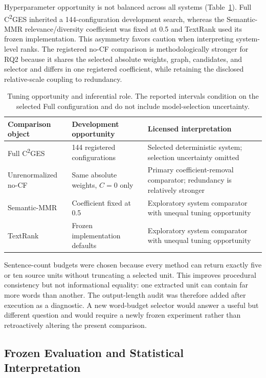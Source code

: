 \documentclass[applsci,article,submit,moreauthors]{Definitions/mdpi}
\newcommand{\cges}{C\textsuperscript{2}GES}
\begin{document}
Hyperparameter opportunity is not balanced across all systems (Table~\ref{tab:tuning-opportunity}). Full \cges{} inherited a 144-configuration development search, whereas the Semantic-MMR relevance/diversity coefficient was fixed at 0.5 and TextRank used its frozen implementation. This asymmetry favors caution when interpreting system-level ranks. The registered no-CF comparison is methodologically stronger for RQ2 because it shares the selected absolute weights, graph, candidates, and selector and differs in one registered coefficient, while retaining the disclosed relative-scale coupling to redundancy.

\begin{table}[H]
\caption{Tuning opportunity and inferential role. The reported intervals condition on the selected Full configuration and do not include model-selection uncertainty.}
\label{tab:tuning-opportunity}\centering\small
\begin{tabular}{p{}p{}p{}}
\toprule
Comparison object & Development opportunity & Licensed interpretation\\
\midrule
Full \cges{} & 144 registered configurations & Selected deterministic system; selection uncertainty omitted\\
Unrenormalized no-CF & Same absolute weights, $C=0$ only & Primary coefficient-removal comparator; redundancy is relatively stronger\\
Semantic-MMR & Coefficient fixed at 0.5 & Exploratory system comparator with unequal tuning opportunity\\
TextRank & Frozen implementation defaults & Exploratory system comparator with unequal tuning opportunity\\
\bottomrule
\end{tabular}
\end{table}

Sentence-count budgets were chosen because every method can return exactly five or ten source units without truncating a selected unit. This improves procedural consistency but not informational equality: one extracted unit can contain far more words than another. The output-length audit was therefore added after execution as a diagnostic. A new word-budget selector would answer a useful but different question and would require a newly frozen experiment rather than retroactively altering the present comparison.

\subsection{Frozen Evaluation and Statistical Interpretation}
\end{document}
